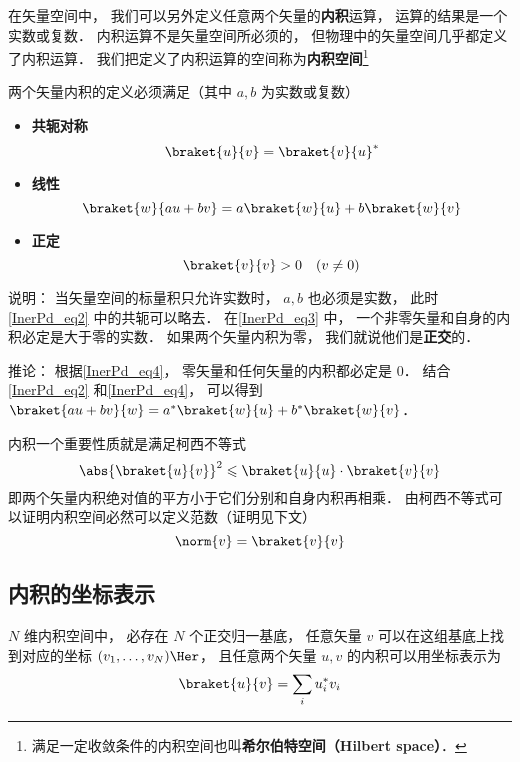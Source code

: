 

在矢量空间中， 我们可以另外定义任意两个矢量的\textbf{内积}运算， 运算的结果是一个实数或复数． 内积运算不是矢量空间所必须的， 但物理中的矢量空间几乎都定义了内积运算． 我们把定义了内积运算的空间称为\textbf{内积空间}\footnote{满足一定收敛条件的内积空间也叫\textbf{希尔伯特空间（Hilbert space）}．}

两个矢量内积的定义必须满足（其中 $a, b$ 为实数或复数）

\begin{itemize}
\item \textbf{共轭对称}
\begin{equation}\label{InerPd_eq2}
\braket{u}{v} = \braket{v}{u}^*
\end{equation}
\item \textbf{线性}
\begin{equation}\label{InerPd_eq4}
\braket{w}{a u + b v} = a\braket{w}{u} + b\braket{w}{v}
\end{equation}
\item \textbf{正定}
\begin{equation}\label{InerPd_eq3}
\braket{v}{v} > 0 \quad (v \ne 0)
\end{equation}
\end{itemize}

说明： 当矢量空间的标量积只允许实数时， $a, b$ 也必须是实数， 此时\autoref{InerPd_eq2} 中的共轭可以略去． 在\autoref{InerPd_eq3} 中， 一个非零矢量和自身的内积必定是大于零的实数． 如果两个矢量内积为零， 我们就说他们是\textbf{正交}的．

推论： 根据\autoref{InerPd_eq4}， 零矢量和任何矢量的内积都必定是 0． 结合\autoref{InerPd_eq2} 和\autoref{InerPd_eq4}， 可以得到 $\braket{a u + b v}{w} = a^*\braket{w}{u} + b^*\braket{w}{v}$．

内积一个重要性质就是满足柯西不等式
\begin{equation}
\abs{\braket{u}{v}}^2 \leqslant \braket{u}{u} \cdot \braket{v}{v}
\end{equation}
即两个矢量内积绝对值的平方小于它们分别和自身内积再相乘． 由柯西不等式可以证明内积空间必然可以定义范数（证明见下文）
\begin{equation}
\norm{v} = \braket{v}{v}
\end{equation}

\subsection{内积的坐标表示}
$N$ 维内积空间中， 必存在 $N$ 个正交归一基底， 任意矢量 $v$ 可以在这组基底上找到对应的坐标 $(v_1, \dots, v_N)\Her$， 且任意两个矢量 $u, v$ 的内积可以用坐标表示为
\begin{equation}
\braket{u}{v} = \sum_i u_i^* v_i
\end{equation}

